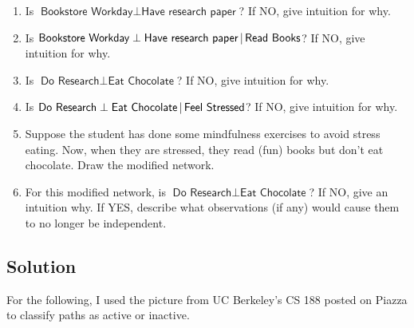 \documentclass[submit]{harvardml}
\newcommand{\attr}[1]{\textsf{#1}}
\begin{document}
\begin{problem}
%
\begin{enumerate}
\item Is $\attr{Bookstore Workday} \perp \attr{Have research paper}$?
  If NO, give intuition for why.
%
%
\item Is $\attr{Bookstore Workday} \perp \attr{Have research
  paper}\given \attr{Read Books}$? If NO, give intuition for why.
%
%
\item Is $\attr{Do Research} \perp \attr{Eat Chocolate}$? If NO, give
  intuition for why.
%
\item Is $\attr{Do Research} \perp \attr{Eat Chocolate} \given
  \attr{Feel Stressed}$? If NO, give intuition for why.
%
\item Suppose the student has done some mindfulness exercises to avoid
  stress eating.  Now, when they are stressed, they read (fun) books
  but don't eat chocolate.  Draw the modified network.
%
%
\item For this modified network, is $\attr{Do Research} \perp
  \attr{Eat Chocolate}$? If NO, give an intuition why.  If YES,
  describe what observations (if any) would cause them to no longer be
  independent.
%
\end{enumerate}
\end{problem}
\subsection*{Solution}

For the following, I used the picture from UC Berkeley's CS 188 posted on Piazza to classify paths as active or inactive.
\end{document}
